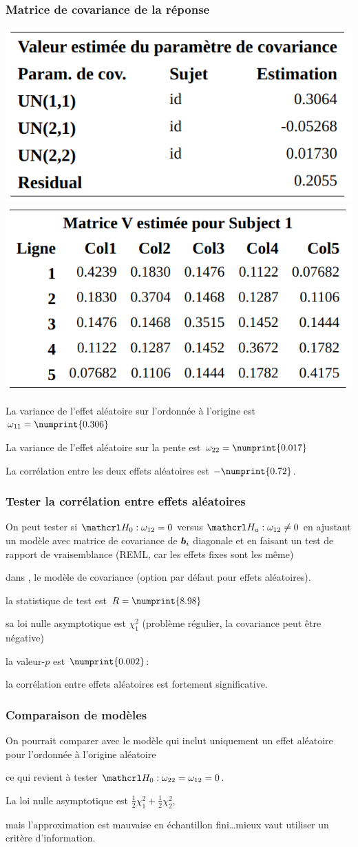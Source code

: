 \documentclass{beamer}
\begin{document}
\begin{frame}
 \frametitle{Matrice de covariance de la réponse}
 \begin{center}
\includegraphics[width = 0.47\linewidth]{img/c6/diapos7-e25}
\includegraphics[width = 0.5\linewidth]{img/c6/diapos7-e24}
\end{center}
\bi \item 
La variance de l'effet aléatoire sur l'ordonnée à l'origine est $\omega_{11}=\numprint{0.306}$
\item La variance de l'effet aléatoire sur la pente est $\omega_{22}=\numprint{0.017}$
\item La corrélation entre les deux effets aléatoires est $-\numprint{0.72}$.
\ei
\end{frame}
\begin{frame}
\frametitle{Tester la corrélation entre effets aléatoires}
\bi
\item On peut tester si  $\Hy_0: \omega_{12}=0$ versus $\Hy_a: \omega_{12} \neq 0$ en ajustant un modèle avec matrice de covariance de $\boldsymbol {b}_i$ diagonale et en faisant un test de rapport de vraisemblance (REML, car les effets fixes sont les même) \bi 
\item dans \SASlang{}, le modèle de covariance  (option par défaut pour effets aléatoires).
\item la statistique de test est $R=\numprint{8.98}$ 
\item sa loi nulle asymptotique est $\chi^2_1$ (problème régulier, la covariance peut être négative)
\item la valeur-$p$ est $\numprint{0.002}$:
\item la corrélation entre effets aléatoires est fortement significative. \ei
\ei
\end{frame}
\begin{frame}
\frametitle{Comparaison de modèles}
\bi \item 
 On pourrait comparer avec le modèle qui inclut uniquement un effet aléatoire pour l'ordonnée à l'origine aléatoire
 \bi \item ce qui revient à tester $\Hy_0: \omega_{22} = \omega_{12}=0$.  
 \item La loi nulle asymptotique est  $\frac{1}{2} \chi^2_1 + \frac{1}{2} \chi^2_2$, 
 \item mais l'approximation est mauvaise en échantillon fini\ldots mieux vaut utiliser un critère d'information.
 \ei
 \ei
\end{frame}
\end{document}
